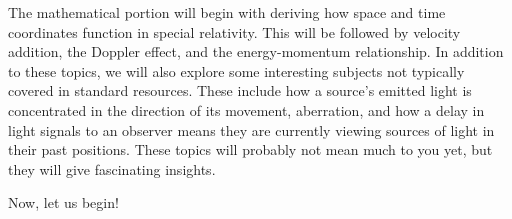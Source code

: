 The mathematical portion will begin with deriving how space and time coordinates function in special relativity.
This will be followed by velocity addition, the Doppler effect, and the energy-momentum relationship.
In addition to these topics, we will also explore some interesting subjects not typically covered in standard resources.
These include how a source's emitted light is concentrated in the direction of its movement, aberration, and how a delay in light signals to an observer means they are currently viewing sources of light in their past positions.
These topics will probably not mean much to you yet, but they will give fascinating insights.

Now, let us begin!

\newpage






